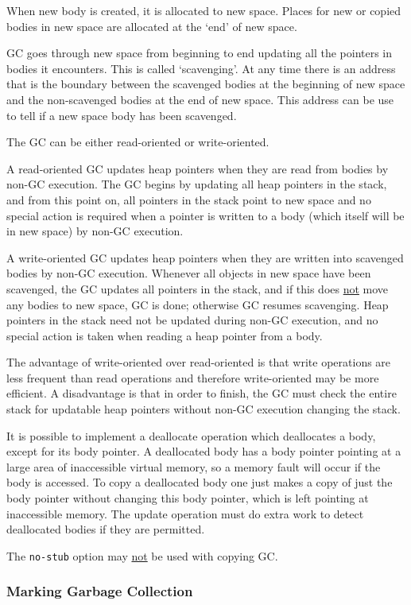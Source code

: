 \documentclass[12pt]{article}
\begin{document}
When new body is created, it is allocated to new space.
Places for new or copied bodies in new space are
allocated at the `end' of new space.

GC goes through new space from beginning to end updating
all the pointers in bodies it encounters.  This is called
`scavenging'.  At any time there is an address that is the
boundary between the scavenged bodies at the beginning
of new space and the non-scavenged bodies at the end of
new space.  This address can be use to tell if a new space
body has been scavenged.

The GC can be either read-oriented or write-oriented.

A read-oriented GC updates heap pointers when they are read
from bodies by non-GC execution.
The GC begins by updating all heap pointers in the
stack, and from this point on, all pointers in the stack
point to new space and no special action is required when
a pointer is written to a body (which itself will be in new
space) by non-GC execution.

A write-oriented GC updates heap pointers when they are
written into scavenged bodies by non-GC execution. 
Whenever all objects in new space have been scavenged,
the GC updates all pointers in the stack, and if this does \underline{not}
move any bodies to new space, GC is done; otherwise
GC resumes scavenging.  Heap pointers in the stack need
not be updated during non-GC execution, and no special action is taken
when reading a heap pointer from a body.

The advantage of write-oriented over read-oriented is
that write operations are less frequent than read
operations and therefore write-oriented may be more
efficient.  A disadvantage is that in order to finish, the GC
must check the entire stack for updatable heap pointers
without non-GC execution changing the stack.

It is possible to implement a deallocate operation
which deallocates a body, except for its body pointer.
A deallocated body has a body pointer pointing at
a large area of inaccessible virtual memory, so a
memory fault will occur if the body is accessed.
To copy a deallocated body one just makes a copy
of just the body pointer without changing this body pointer,
which is left pointing at inaccessible memory.
The update operation must do extra work to detect
deallocated bodies if they are permitted.

The {\tt no-stub} option may \underline{not} be used with
copying GC.

\subsubsection{Marking Garbage Collection}
\end{document}
